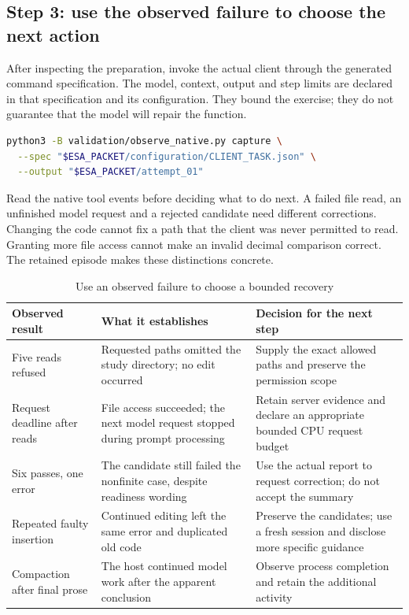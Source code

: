 \subsection*{Step 3: use the observed failure to choose the next action}

After inspecting the preparation, invoke the actual client through the generated command specification. The model, context, output and step limits are declared in that specification and its configuration. They bound the exercise; they do not guarantee that the model will repair the function.

\begin{lstlisting}[language=bash]
python3 -B validation/observe_native.py capture \
  --spec "$ESA_PACKET/configuration/CLIENT_TASK.json" \
  --output "$ESA_PACKET/attempt_01"
\end{lstlisting}

Read the native tool events before deciding what to do next. A failed file read, an unfinished model request and a rejected candidate need different corrections. Changing the code cannot fix a path that the client was never permitted to read. Granting more file access cannot make an invalid decimal comparison correct. The retained episode makes these distinctions concrete.

\begin{table}[H]\centering\small
\caption{Use an observed failure to choose a bounded recovery}\label{tab:ch2-native-recovery}
\begin{tabularx}{\textwidth}{@{}p{}XX@{}}\toprule
\textbf{Observed result} & \textbf{What it establishes} & \textbf{Decision for the next step}\\\midrule
Five reads refused & Requested paths omitted the study directory; no edit occurred & Supply the exact allowed paths and preserve the permission scope\\
Request deadline after reads & File access succeeded; the next model request stopped during prompt processing & Retain server evidence and declare an appropriate bounded CPU request budget\\
Six passes, one error & The candidate still failed the nonfinite case, despite readiness wording & Use the actual report to request correction; do not accept the summary\\
Repeated faulty insertion & Continued editing left the same error and duplicated old code & Preserve the candidates; use a fresh session and disclose more specific guidance\\
Compaction after final prose & The host continued model work after the apparent conclusion & Observe process completion and retain the additional activity\\\bottomrule
\end{tabularx}
\end{table}

